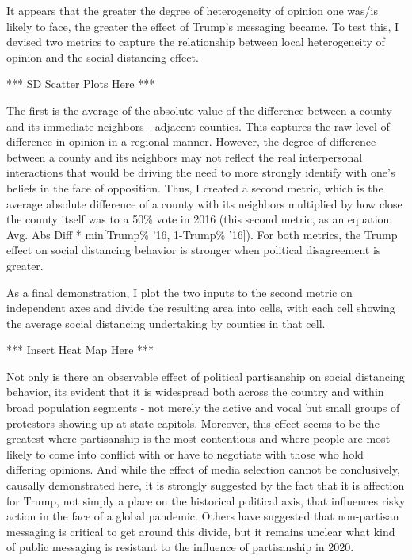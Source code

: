 \documentclass{article}
\begin{document}
\begin{enumerate}
	It appears that the greater the degree of heterogeneity of opinion one was/is likely to face, the greater the effect of Trump's messaging became. To test this, I devised two metrics to capture the relationship between local heterogeneity of opinion and the social distancing effect. 
	
	*** SD Scatter Plots Here ***

	The first is the average of the absolute value of the difference between a county and its immediate neighbors - adjacent counties. This captures the raw level of difference in opinion in a regional manner. However, the degree of difference between a county and its neighbors may not reflect the real interpersonal interactions that would be driving the need to more strongly identify with one's beliefs in the face of opposition. Thus, I created a second metric, which is the average absolute difference of a county with its neighbors multiplied by how close the county itself was to a 50\% vote in 2016 (this second metric, as an equation: Avg. Abs Diff * min[Trump\% '16, 1-Trump\% '16]). For both metrics, the Trump effect on social distancing behavior is stronger when political disagreement is greater. 
	
	As a final demonstration, I plot the two inputs to the second metric on independent axes and divide the resulting area into cells, with each cell showing the average social distancing undertaking by counties in that cell.
	
	*** Insert Heat Map Here ***
	
	Not only is there an observable effect of political partisanship on social distancing behavior, its evident that it is widespread both across the country and within broad population segments - not merely the active and vocal but small groups of protestors showing up at state capitols. Moreover, this effect seems to be the greatest where partisanship is the most contentious and where people are most likely to come into conflict with or have to negotiate with those who hold differing opinions. And while the effect of media selection cannot be conclusively, causally demonstrated here, it is strongly suggested by the fact that it is affection for Trump, not simply a place on the historical political axis, that influences risky action in the face of a global pandemic. Others have suggested that non-partisan messaging is critical to get around this divide, but it remains unclear what kind of public messaging is resistant to the influence of partisanship in 2020. 

	
\end{enumerate}
\end{document}
